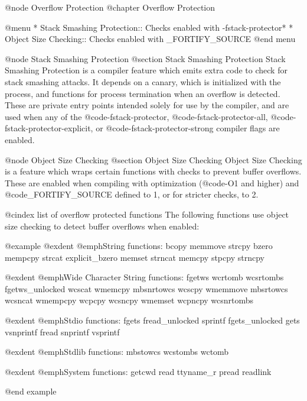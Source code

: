 @node Overflow Protection
@chapter Overflow Protection

@menu
* Stack Smashing Protection::    Checks enabled with -fstack-protector*
* Object Size Checking::         Checks enabled with _FORTIFY_SOURCE
@end menu

@node Stack Smashing Protection
@section Stack Smashing Protection
Stack Smashing Protection is a compiler feature which emits extra code
to check for stack smashing attacks.  It depends on a canary, which is
initialized with the process, and functions for process termination when
an overflow is detected.  These are private entry points intended solely
for use by the compiler, and are used when any of the @code{-fstack-protector},
@code{-fstack-protector-all}, @code{-fstack-protector-explicit}, or
@code{-fstack-protector-strong} compiler flags are enabled.

@node Object Size Checking
@section Object Size Checking
Object Size Checking is a feature which wraps certain functions with checks
to prevent buffer overflows.  These are enabled when compiling with
optimization (@code{-O1} and higher) and @code{_FORTIFY_SOURCE} defined
to 1, or for stricter checks, to 2.

@cindex list of overflow protected functions
The following functions use object size checking to detect buffer overflows
when enabled:

@example
@exdent @emph{String functions:}
bcopy           memmove         strcpy
bzero           mempcpy         strcat
explicit_bzero  memset          strncat
memcpy          stpcpy          strncpy

@exdent @emph{Wide Character String functions:}
fgetws          wcrtomb         wcsrtombs
fgetws_unlocked wcscat          wmemcpy
mbsnrtowcs      wcscpy          wmemmove
mbsrtowcs       wcsncat         wmempcpy
wcpcpy          wcsncpy         wmemset
wcpncpy         wcsnrtombs

@exdent @emph{Stdio functions:}
fgets           fread_unlocked  sprintf
fgets_unlocked  gets            vsnprintf
fread           snprintf        vsprintf

@exdent @emph{Stdlib functions:}
mbstowcs        wcstombs        wctomb

@exdent @emph{System functions:}
getcwd          read            ttyname_r
pread           readlink

@end example
